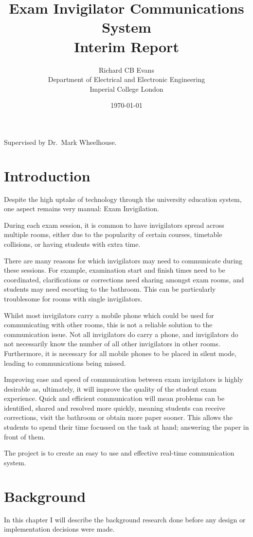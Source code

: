 \documentclass[a4paper, 12pt, notitlepage]{report}
\title{Exam Invigilator Communications System\\
Interim Report} %
\author{Richard CB Evans\\
Department of Electrical and Electronic Engineering\\
Imperial College London} %
\date{\today} %
\begin{document}
\maketitle
\begin{center}
Supervised by Dr.\ Mark Wheelhouse. %
\end{center}
\thispagestyle{empty}
\newpage

\tableofcontents 

\chapter{Introduction}
%
Despite the high uptake of technology through the university education system, one aspect remains very manual: Exam Invigilation.

During each exam session, it is common to have invigilators spread across multiple rooms, either due to the popularity of certain courses, timetable collisions, or having students with extra time.

There are many reasons for which invigilators may need to communicate during these sessions.  For example, examination start and finish times need to be coordinated, clarifications or corrections need sharing amongst exam rooms, and students may need escorting to the bathroom.  This can be particularly troublesome for rooms with single invigilators.

Whilst most invigilators carry a mobile phone which could be used for communicating with other rooms, this is not a reliable solution to the communication issue.  Not all invigilators do carry a phone, and invigilators do not necessarily know the number of all other invigilators in other rooms.  Furthermore, it is necessary for all mobile phones to be placed in silent mode, leading to communications being missed.

Improving ease and speed of communication between exam invigilators is highly desirable as, ultimately, it will improve the quality of the student exam experience.  Quick and efficient communication will mean problems can be identified, shared and resolved more quickly, meaning students can receive corrections, visit the bathroom or obtain more paper sooner.  This allows the students to spend their time focussed on the task at hand; answering the paper in front of them.

The project is to create an easy to use and effective real-time communication system.

\chapter{Background}
%
In this chapter I will describe the background research done before any design or implementation decisions were made.
\end{document}
